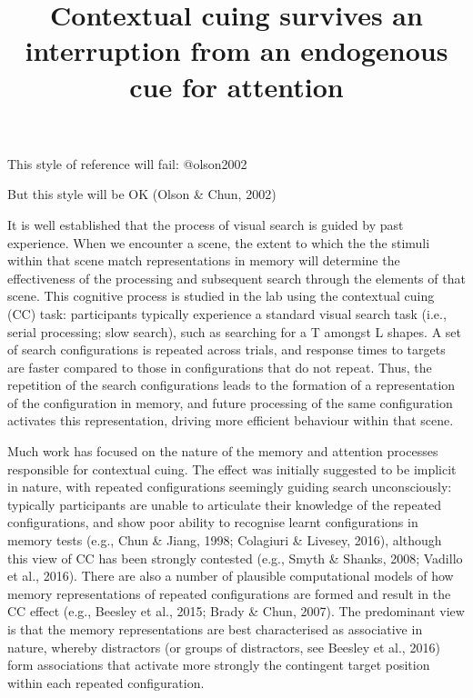 \documentclass[
  man,
  floatsintext,
  longtable,
  nolmodern,
  notxfonts,
  notimes,
  colorlinks=true,linkcolor=blue,citecolor=blue,urlcolor=blue]{apa7}
\title{Contextual cuing survives an interruption from an endogenous cue
for attention}
\begin{document}
\maketitle


\setcounter{secnumdepth}{-\maxdimen} %

\setlength\LTleft{0pt}




This style of reference will fail: @olson2002

But this style will be OK (Olson \& Chun, 2002)

It is well established that the process of visual search is guided by
past experience. When we encounter a scene, the extent to which the the
stimuli within that scene match representations in memory will determine
the effectiveness of the processing and subsequent search through the
elements of that scene. This cognitive process is studied in the lab
using the contextual cuing (CC) task: participants typically experience
a standard visual search task (i.e., serial processing; slow search),
such as searching for a T amongst L shapes. A set of search
configurations is repeated across trials, and response times to targets
are faster compared to those in configurations that do not repeat. Thus,
the repetition of the search configurations leads to the formation of a
representation of the configuration in memory, and future processing of
the same configuration activates this representation, driving more
efficient behaviour within that scene.

Much work has focused on the nature of the memory and attention
processes responsible for contextual cuing. The effect was initially
suggested to be implicit in nature, with repeated configurations
seemingly guiding search unconsciously: typically participants are
unable to articulate their knowledge of the repeated configurations, and
show poor ability to recognise learnt configurations in memory tests
(e.g., Chun \& Jiang, 1998; Colagiuri \& Livesey, 2016), although this
view of CC has been strongly contested (e.g., Smyth \& Shanks, 2008;
Vadillo et al., 2016). There are also a number of plausible
computational models of how memory representations of repeated
configurations are formed and result in the CC effect (e.g., Beesley et
al., 2015; Brady \& Chun, 2007). The predominant view is that the memory
representations are best characterised as associative in nature, whereby
distractors (or groups of distractors, see Beesley et al., 2016) form
associations that activate more strongly the contingent target position
within each repeated configuration.
\end{document}
